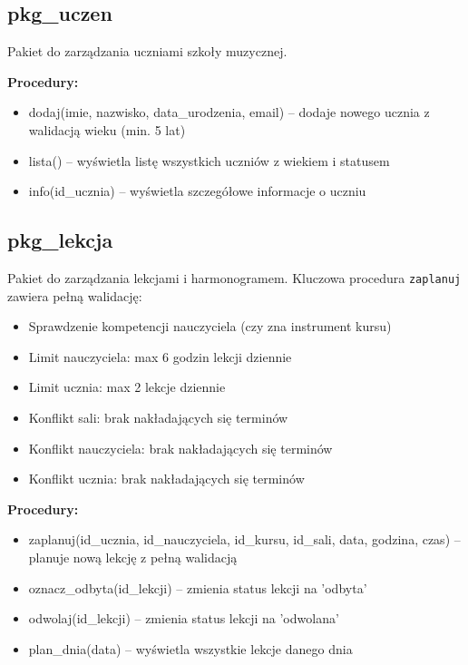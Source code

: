 \documentclass[12pt,a4paper]{article}
\begin{document}
\subsection{pkg\_uczen}

Pakiet do zarządzania uczniami szkoły muzycznej.

\textbf{Procedury:}
\begin{itemize}[nosep]
    \item dodaj(imie, nazwisko, data\_urodzenia, email) -- dodaje nowego ucznia z walidacją wieku (min. 5 lat)
    \item lista() -- wyświetla listę wszystkich uczniów z wiekiem i statusem
    \item info(id\_ucznia) -- wyświetla szczegółowe informacje o uczniu
\end{itemize}

\subsection{pkg\_lekcja}

Pakiet do zarządzania lekcjami i harmonogramem. Kluczowa procedura \texttt{zaplanuj} zawiera pełną walidację:
\begin{itemize}[nosep]
    \item Sprawdzenie kompetencji nauczyciela (czy zna instrument kursu)
    \item Limit nauczyciela: max 6 godzin lekcji dziennie
    \item Limit ucznia: max 2 lekcje dziennie
    \item Konflikt sali: brak nakładających się terminów
    \item Konflikt nauczyciela: brak nakładających się terminów
    \item Konflikt ucznia: brak nakładających się terminów
\end{itemize}

\textbf{Procedury:}
\begin{itemize}[nosep]
    \item zaplanuj(id\_ucznia, id\_nauczyciela, id\_kursu, id\_sali, data, godzina, czas) -- planuje nową lekcję z pełną walidacją
    \item oznacz\_odbyta(id\_lekcji) -- zmienia status lekcji na 'odbyta'
    \item odwolaj(id\_lekcji) -- zmienia status lekcji na 'odwolana'
    \item plan\_dnia(data) -- wyświetla wszystkie lekcje danego dnia
\end{itemize}
\end{document}
